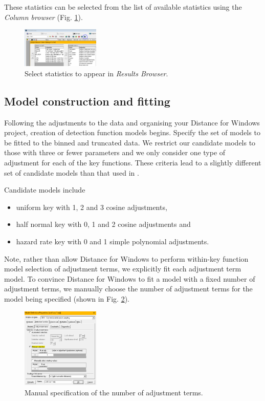 \documentclass[a4paper, 10pt]{article}
\begin{document}
These statistics can be selected from the list of available statistics using the \emph{Column browser} (Fig. \ref{fig:columns}).

\begin{figure}
\includegraphics[width=0.33\textwidth]{images/column-mgr.png}
\caption{Select statistics to appear in \emph{Results Browser}. \label{fig:columns}}
\vspace{-25pt}
\end{figure}

\subsection{Model construction and fitting}
Following the adjustments to the data and organising your Distance for Windows project, creation of detection function models begins.  Specify the set of models to be fitted to the binned and truncated data.  We restrict our candidate models to those with three or fewer parameters and we only consider one type of adjustment for each of the key functions.  These criteria lead to a slightly different set of candidate models than that used in \citet{howeetal}.

Candidate models include 
\begin{itemize}
	\item uniform key with 1, 2 and 3 cosine adjustments, 
	\item half normal key with 0, 1 and 2 cosine adjustments and
	\item hazard rate key with 0 and 1 simple polynomial adjustments. 
\end{itemize}
 
 Note, rather than allow Distance for Windows to perform within-key function model selection of adjustment terms, we explicitly fit each adjustment term model. To convince Distance for Windows to fit a model with a fixed number of adjustment terms, we manually choose the number of adjustment terms for the model being specified (shown in Fig. \ref{fig:manual}).
 
\begin{figure}
\includegraphics[width=0.33\textwidth]{images/manual-adjterms.png}
\caption{Manual specification of the number of adjustment terms. \label{fig:manual}}
\vspace{-35pt}
\end{figure} 
\end{document}
